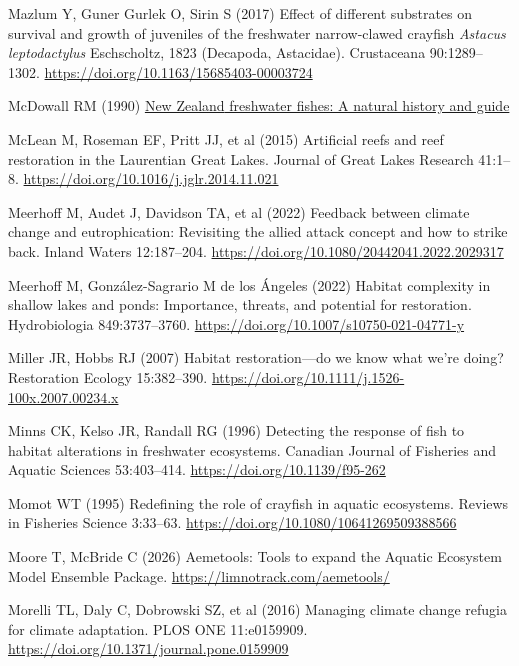 \documentclass[
  12pt,
  a4paper,
  oneside]{scrbook}
\newlength{\cslhangindent}
\newenvironment{CSLReferences}[2] %
 {\begin{list}{}{%
  \setlength{\itemindent}{0pt}
  \setlength{\leftmargin}{0pt}
  \setlength{\parsep}{0pt}
  \ifodd #1
   \setlength{\leftmargin}{\cslhangindent}
   \setlength{\itemindent}{-1\cslhangindent}
  \fi
  \setlength{\itemsep}{#2\baselineskip}}}
 {\end{list}}
\renewenvironment{CSLReferences}[2]
   {\begin{list}{}{%
    \setlength{\itemindent}{0pt}
    \setlength{\leftmargin}{0pt}
    \setlength{\parsep}{0pt}
    \ifodd #1
     \setlength{\leftmargin}{\cslhangindent}
     \setlength{\itemindent}{-1\cslhangindent}
    \fi
    \setlength{\itemsep}{0.3\baselineskip}}}
   {\end{list}}%
\begin{document}
\begin{CSLReferences}{1}{1}
Mazlum Y, Guner Gurlek O, Sirin S (2017) Effect of different substrates
on survival and growth of juveniles of the freshwater narrow-clawed
crayfish {\emph{Astacus leptodactylus}} {Eschscholtz}, 1823 ({Decapoda,
Astacidae}). Crustaceana 90:1289--1302.
\url{https://doi.org/10.1163/15685403-00003724}

McDowall RM (1990)
\href{https://agris.fao.org/search/en/providers/122621/records/6473966cce9437aa76003d0e}{{New
Zealand} freshwater fishes: A natural history and guide}

McLean M, Roseman EF, Pritt JJ, et al (2015) Artificial reefs and reef
restoration in the {Laurentian Great Lakes}. Journal of Great Lakes
Research 41:1--8. \url{https://doi.org/10.1016/j.jglr.2014.11.021}

Meerhoff M, Audet J, Davidson TA, et al (2022) Feedback between climate
change and eutrophication: Revisiting the allied attack concept and how
to strike back. Inland Waters 12:187--204.
\url{https://doi.org/10.1080/20442041.2022.2029317}

Meerhoff M, González-Sagrario M de los Ángeles (2022) Habitat complexity
in shallow lakes and ponds: Importance, threats, and potential for
restoration. Hydrobiologia 849:3737--3760.
\url{https://doi.org/10.1007/s10750-021-04771-y}

Miller JR, Hobbs RJ (2007) Habitat restoration---do we know what we're
doing? Restoration Ecology 15:382--390.
\url{https://doi.org/10.1111/j.1526-100x.2007.00234.x}

Minns CK, Kelso JR, Randall RG (1996) Detecting the response of fish to
habitat alterations in freshwater ecosystems. Canadian Journal of
Fisheries and Aquatic Sciences 53:403--414.
\url{https://doi.org/10.1139/f95-262}

Momot WT (1995) Redefining the role of crayfish in aquatic ecosystems.
Reviews in Fisheries Science 3:33--63.
\url{https://doi.org/10.1080/10641269509388566}

Moore T, McBride C (2026) Aemetools: {Tools} to expand the {Aquatic
Ecosystem Model Ensemble Package}.
\url{https://limnotrack.com/aemetools/}

Morelli TL, Daly C, Dobrowski SZ, et al (2016) Managing climate change
refugia for climate adaptation. PLOS ONE 11:e0159909.
\url{https://doi.org/10.1371/journal.pone.0159909}


\end{CSLReferences}
\end{document}
